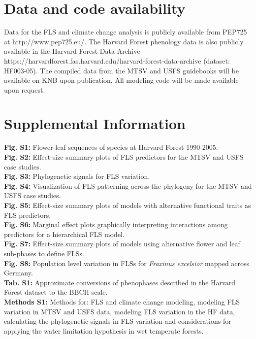 \documentclass[11pt]{article}
\begin{document}
\section*{Data and code availability}
Data for the FLS and climate change analysis is publicly available from PEP725 at http://www.pep725.eu/. The Harvard Forest phenology data is also publicly available in the Harvard Forest Data Archive https://harvardforest.fas.harvard.edu/harvard-forest-data-archive (dataset: HF003-05). The compiled data from the MTSV and USFS guidebooks will be available on KNB upon publication. All modeling code will be made available upon request. %




\newpage
\section*{Supplemental Information}
\textbf{Fig. S1:} Flower-leaf sequences of species at Harvard Forest 1990-2005.\\
\textbf{Fig. S2:} Effect-size summary plots of FLS predictors for the MTSV and USFS case studies. \\
\textbf{Fig. S3:} Phylogenetic signals for FLS variation.\\
\textbf{Fig. S4:} Visualization of FLS patterning across the phylogeny for the MTSV and USFS case studies.\\
\textbf{Fig. S5:} Effect-size summary plots of models with alternative functional traits as FLS predictors.\\
\textbf{Fig. S6:} Marginal effect plots graphically interpreting interactions among predictors for a hierarchical FLS model.\\
\textbf{Fig. S7:} Effect-size summary plots of models using alternative flower and leaf sub-phases to define FLSs.\\
\textbf{Fig. S8:} Population level variation in FLSs for \emph{Fraxinus excelsior} mapped across Germany.\\
\textbf{Tab. S1:} Approximate conversions of phenophases described in the Harvard Forest dataset to the BBCH scale.\\
\textbf{Methods S1:} Methods for: FLS and climate change modeling, modeling FLS variation in MTSV and USFS data, modeling FLS variation in the HF data, calculating the phylogenetic signals in FLS variation and considerations for applying the water limitation hypothesis in wet temperate forests.
\newpage
\end{document}

